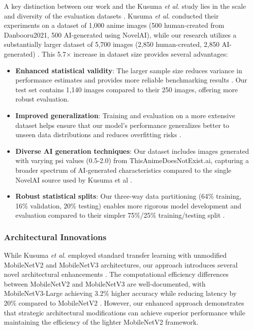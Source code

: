 \documentclass{article}
\begin{document}
A key distinction between our work and the Kusuma \textit{et al.} study lies in the scale and diversity of the evaluation datasets \cite{kusuma2024detection}. Kusuma \textit{et al.} conducted their experiments on a dataset of 1,000 anime images (500 human-created from Danbooru2021, 500 AI-generated using NovelAI), while our research utilizes a substantially larger dataset of 5,700 images (2,850 human-created, 2,850 AI-generated) \cite{kusuma2024detection}. This 5.7× increase in dataset size provides several advantages:

\begin{itemize}
    \item \textbf{Enhanced statistical validity}: The larger sample size reduces variance in performance estimates and provides more reliable benchmarking results \cite{kusuma2024detection}. Our test set contains 1,140 images compared to their 250 images, offering more robust evaluation.
    
    \item \textbf{Improved generalization}: Training and evaluation on a more extensive dataset helps ensure that our model's performance generalizes better to unseen data distributions and reduces overfitting risks \cite{kusuma2024detection}.
    
    \item \textbf{Diverse AI generation techniques}: Our dataset includes images generated with varying psi values (0.5-2.0) from ThisAnimeDoesNotExist.ai, capturing a broader spectrum of AI-generated characteristics compared to the single NovelAI source used by Kusuma et al \cite{kusuma2024detection}.
    
    \item \textbf{Robust statistical splits}: Our three-way data partitioning (64\% training, 16\% validation, 20\% testing) enables more rigorous model development and evaluation compared to their simpler 75\%/25\% training/testing split \cite{kusuma2024detection}.
\end{itemize}

\subsubsection{Architectural Innovations}

While Kusuma \textit{et al.} employed standard transfer learning with unmodified MobileNetV2 and MobileNetV3 architectures, our approach introduces several novel architectural enhancements \cite{kusuma2024detection}\cite{howard2019searching}. The computational efficiency differences between MobileNetV2 and MobileNetV3 are well-documented, with MobileNetV3-Large achieving 3.2\% higher accuracy while reducing latency by 20\% compared to MobileNetV2 \cite{howard2019searching}. However, our enhanced approach demonstrates that strategic architectural modifications can achieve superior performance while maintaining the efficiency of the lighter MobileNetV2 framework.
\end{document}
